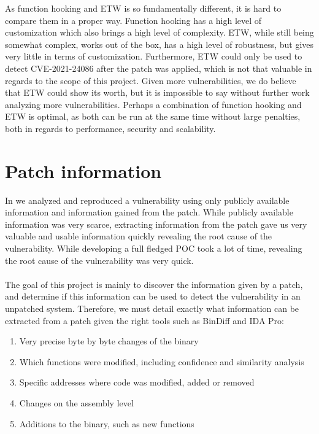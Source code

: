 \documentclass{report}
\begin{document}
As function hooking and \gls{ETW} is so fundamentally different, it is hard to compare them in a proper way. Function hooking has a high level of customization which also brings a high level of complexity. \gls{ETW}, while still being somewhat complex, works out of the box, has a high level of robustness, but gives very little in terms of customization. Furthermore, \gls{ETW} could only be used to detect CVE-2021-24086 after the patch was applied, which is not that valuable in regards to the scope of this project. Given more vulnerabilities, we do believe that \gls{ETW} could show its worth, but it is impossible to say without further work analyzing more vulnerabilities. Perhaps a combination of function hooking and \gls{ETW} is optimal, as both can be run at the same time without large penalties, both in regards to performance, security and scalability.

\section{Patch information}
In  we analyzed and reproduced a vulnerability using only publicly available information and information gained from the patch. While publicly available information was very scarce, extracting information from the patch gave us very valuable and usable information quickly revealing the root cause of the vulnerability. While developing a full fledged \gls{POC} took a lot of time, revealing the root cause of the vulnerability was very quick.
\\
\\
The goal of this project is mainly to discover the information given by a patch, and determine if this information can be used to detect the vulnerability in an unpatched system. Therefore, we must detail exactly what information can be extracted from a patch given the right tools such as BinDiff\cite{url:bindiff:homepage} and IDA Pro\cite{url:ida-pro:homepage}:

\begin{enumerate}
    \item Very precise byte by byte changes of the binary
    \item Which functions were modified, including confidence and similarity analysis
    \item Specific addresses where code was modified, added or removed
    \item Changes on the assembly level
    \item Additions to the binary, such as new functions
\end{enumerate}
\end{document}
